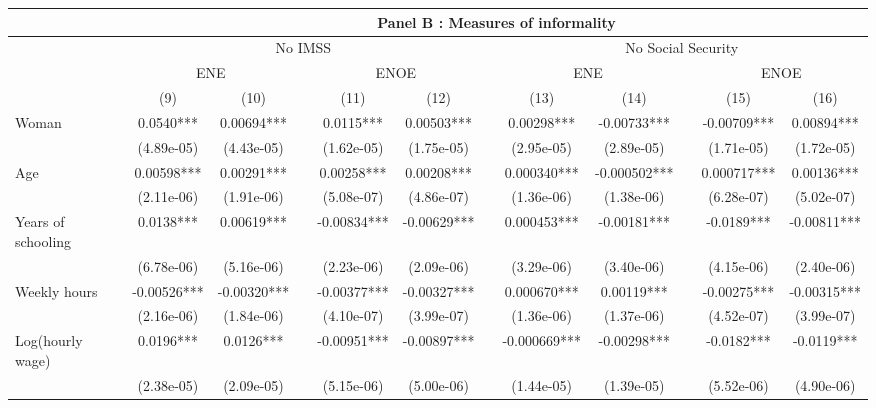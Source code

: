 \begin{tabular}{lccccccccccc}
\toprule
      & \multicolumn{11}{c}{Panel B : Measures of informality} \\
\midrule
\midrule
      & \multicolumn{5}{c}{No IMSS}           &       & \multicolumn{5}{c}{No Social Security} \\
\cmidrule{2-6}\cmidrule{8-12}      & \multicolumn{2}{c}{ENE} &       & \multicolumn{2}{c}{ENOE} &       & \multicolumn{2}{c}{ENE} &       & \multicolumn{2}{c}{ENOE} \\
\cmidrule{2-3}\cmidrule{5-6}\cmidrule{8-9}\cmidrule{11-12}      & (9)   & (10)  &       & (11)  & (12)  &       & (13)  & (14)  &       & (15)  & (16) \\
\midrule
\midrule
Woman & 0.0540*** & 0.00694*** &       & 0.0115*** & 0.00503*** &       & 0.00298*** & -0.00733*** &       & -0.00709*** & 0.00894*** \\
      & (4.89e-05) & (4.43e-05) &       & (1.62e-05) & (1.75e-05) &       & (2.95e-05) & (2.89e-05) &       & (1.71e-05) & (1.72e-05) \\
Age   & 0.00598*** & 0.00291*** &       & 0.00258*** & 0.00208*** &       & 0.000340*** & -0.000502*** &       & 0.000717*** & 0.00136*** \\
      & (2.11e-06) & (1.91e-06) &       & (5.08e-07) & (4.86e-07) &       & (1.36e-06) & (1.38e-06) &       & (6.28e-07) & (5.02e-07) \\
Years of schooling & 0.0138*** & 0.00619*** &       & -0.00834*** & -0.00629*** &       & 0.000453*** & -0.00181*** &       & -0.0189*** & -0.00811*** \\
      & (6.78e-06) & (5.16e-06) &       & (2.23e-06) & (2.09e-06) &       & (3.29e-06) & (3.40e-06) &       & (4.15e-06) & (2.40e-06) \\
Weekly hours & -0.00526*** & -0.00320*** &       & -0.00377*** & -0.00327*** &       & 0.000670*** & 0.00119*** &       & -0.00275*** & -0.00315*** \\
      & (2.16e-06) & (1.84e-06) &       & (4.10e-07) & (3.99e-07) &       & (1.36e-06) & (1.37e-06) &       & (4.52e-07) & (3.99e-07) \\
Log(hourly wage) & 0.0196*** & 0.0126*** &       & -0.00951*** & -0.00897*** &       & -0.000669*** & -0.00298*** &       & -0.0182*** & -0.0119*** \\
      & (2.38e-05) & (2.09e-05) &       & (5.15e-06) & (5.00e-06) &       & (1.44e-05) & (1.39e-05) &       & (5.52e-06) & (4.90e-06) \\

\end{tabular}
